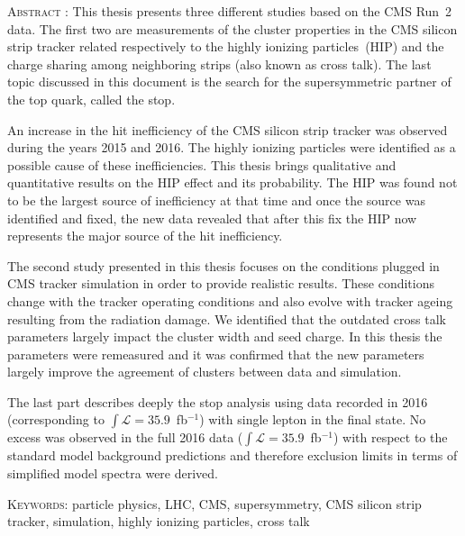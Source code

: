 \vspace*{-0.7cm}
\begin{framed}
    \vspace*{-0.4cm}


\textsc{Abstract} : This thesis presents three different studies based on the CMS Run~2 data. The first two are measurements of the cluster properties in the CMS silicon strip tracker related respectively to the highly ionizing particles~(HIP) and the charge sharing among neighboring strips (also known as cross talk). The last topic discussed in this document is the search for the supersymmetric partner of the top quark, called the stop.

An increase in the hit inefficiency of the CMS silicon strip tracker was observed during the years 2015 and 2016. The highly ionizing particles were identified as a possible cause of these inefficiencies. This thesis brings qualitative and quantitative results on the HIP effect and its probability. The HIP was found not to be the largest source of inefficiency at that time and once the source was identified and fixed, the new data revealed that after this fix the HIP now represents the major source of the hit inefficiency.

The second study presented in this thesis focuses on the conditions plugged in CMS tracker simulation in order to provide realistic results. These conditions change with the tracker operating conditions and also evolve with tracker ageing resulting from the radiation damage. We identified that the outdated cross talk parameters largely impact the cluster width and seed charge. In this thesis the parameters were remeasured and it was confirmed that the new parameters largely improve the agreement of clusters between data and simulation.

The last part describes deeply the stop analysis using data recorded in 2016 (corresponding to $\int{\mathcal{L}}= 35.9$~fb$^{-1}$) with single lepton in the final state. No excess was observed in the full 2016 data ($\int{\mathcal{L}}=35.9$~fb$^{-1}$) with respect to the standard model background predictions and therefore exclusion limits in terms of simplified model spectra were derived.

    \textsc{Keywords}: particle physics, LHC, CMS, supersymmetry, CMS silicon strip tracker, simulation, highly ionizing particles, cross talk
\end{framed}
